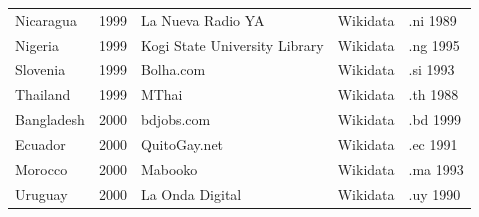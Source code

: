 \documentclass[11pt,a4paper]{article}
\begin{document}
\begin{small}
\begin{longtable}{lrp{6.2cm}ll}
Nicaragua & 1999 & La Nueva Radio YA & Wikidata & .ni 1989\\
Nigeria & 1999 & Kogi State University Library & Wikidata & .ng 1995\\
Slovenia & 1999 & Bolha.com & Wikidata & .si 1993\\
Thailand & 1999 & MThai & Wikidata & .th 1988\\
Bangladesh & 2000 & bdjobs.com & Wikidata & .bd 1999\\
Ecuador & 2000 & QuitoGay.net & Wikidata & .ec 1991\\
Morocco & 2000 & Mabooko & Wikidata & .ma 1993\\
Uruguay & 2000 & La Onda Digital & Wikidata & .uy 1990\\
\bottomrule\end{longtable}\end{small}
\end{document}
